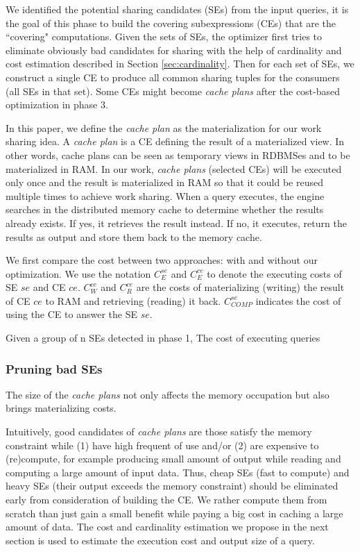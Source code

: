 We identified the potential sharing candidates (SEs) from the input queries, it is the goal of this phase to build the covering subexpressions (CEs) that are the ``covering" computations. Given the sets of SEs, the optimizer first tries to eliminate obviously bad candidates for sharing with the help of cardinality and cost estimation described in Section \ref{sec:cardinality}. Then for each set of SEs, we construct a single CE to produce all common sharing tuples for the consumers (all SEs in that set). Some CEs might become \emph{cache plans} after the cost-based optimization in phase 3. 

In this paper, we define the \emph{cache plan} as the materialization for our work sharing idea. A \emph{cache plan} is a CE defining the result of a materialized view. In other words, cache plans can be seen as temporary views in RDBMSes and to be materialized in RAM. In our work, \emph{cache plans} (selected CEs) will be executed only once and the result is materialized in RAM so that it could be reused multiple times to achieve work sharing. When a query executes, the engine searches in the distributed memory cache to determine whether the results already exists. If yes, it retrieves the result instead. If no, it executes, return the results as output and store them back to the memory cache.

We first compare the cost between two approaches: with and without our optimization. We use the notation $C_{E}^{se}$ and $C_{E}^{ce}$ to denote the executing costs of SE $se$ and CE $ce$. $C_{W}^{ce}$ and $C_{R}^{ce}$ are the costs of materializing (writing) the result of CE $ce$ to RAM and retrieving (reading) it back. $C_{COMP}^{se}$ indicates the cost of using the CE to answer the SE $se$.

Given a group of n SEs detected in phase 1, 
The cost of executing queries 


\subsubsection{Pruning bad SEs}
\label{sec:se-prune}
The size of the \emph{cache plans} not only affects the memory occupation but also brings materializing costs. 


Intuitively, good candidates of \emph{cache plans} are those satisfy the memory constraint while (1) have high frequent of use and/or (2) are expensive to (re)compute, for example producing small amount of output while reading and computing a large amount of input data. Thus, cheap SEs (fast to compute) and heavy SEs (their output exceeds the memory constraint) should be eliminated early from consideration of building the CE. We rather compute them from scratch than just gain a small benefit while paying a big cost in caching a large amount of data. The cost and cardinality estimation we propose in the next section is used to estimate the execution cost and output size of a query.




